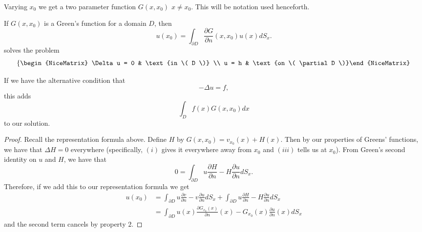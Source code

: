 	\begin{remark}
		Varying \( x_{0} \) we get a two parameter function \( G(x, x_{0}) \) \( x \ne x_{0} \). This will be notation used henceforth.
	\end{remark}

	\begin{theorem}
		If \( G(x, x_{0}) \) is a Green's function for a domain \( D \), then
		\[ u(x_{0}) = \int_{\partial D} \frac{\partial G}{\partial n}(x, x_{0}) u(x) dS_{x}.  \]
		solves the problem
		\[ \left\{\begin{NiceMatrix} \Delta u = 0 & \text{in \( D \)} \\ u = h & \text{on \( \partial D \)}\end{NiceMatrix}\right.  \]

		If we have the alternative condition  that
		\[ - \Delta u = f, \]
		this adds
		\[ \int_{D} f(x) G(x, x_{0}) dx \]
		to our solution.
	\end{theorem}
	\begin{proof}
		Recall the representation formula above.
		Define \( H \) by \( G(x, x_{0}) = v_{x_{0}}(x) + H(x) \). Then by our properties of Greens' functions, we have that \( \Delta H = 0 \) everywhere (specifically, \( (i) \) gives it everywhere away from \( x_{0} \) and \( (iii) \) tells us at \( x_{0} \)). From Green's second identity on \( u \) and \( H \), we have that
		\[ 0 = \int_{\partial D} u \frac{\partial H}{\partial n} - H \frac{\partial u}{\partial n} dS_{x}. \]
		Therefore, if we add this to our representation formula we get
		\begin{align*}
			u(x_{0}) &= \int_{\partial D}  u \frac{\partial v}{\partial n} - v \frac{\partial u}{\partial n} dS_{x} + \int_{\partial D}  u \frac{\partial H}{\partial n} - H \frac{\partial u}{\partial n} dS_{x} \\
							 &= \int_{\partial D} u(x) \frac{\partial G_{x_{0}}(x)}{\partial n}(x) - G_{x_{0}}(x) \frac{\partial u}{\partial n}(x) dS_{x}
		\end{align*}
		and the second term cancels by property \( 2 \).
	\end{proof}

